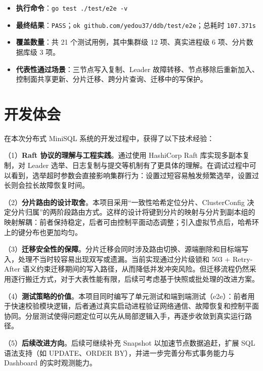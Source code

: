 \documentclass[UTF8,a4paper,12pt]{ctexart}
\begin{document}
\begin{tcolorbox}[
  enhanced,
  colback=GoogleGray,
  colframe=GoogleBlue,
  arc=6pt,
  boxrule=1pt,
  left=1em, right=1em, top=1em, bottom=1em,
  fontupper=\sffamily\small,
  title=\textbf{端到端测试实际运行结果}
]
  \begin{itemize}[leftmargin=2em]
    \item \textbf{执行命令}：\texttt{go test ./test/e2e -v}
    \item \textbf{最终结果}：\texttt{PASS}；\texttt{ok github.com/yedou37/ddb/test/e2e}；总耗时 \texttt{107.371s}
    \item \textbf{覆盖数量}：共 21 个测试用例，其中集群级 12 项、真实进程级 6 项、分片数据库级 3 项。
    \item \textbf{代表性通过场景}：三节点写入复制、Leader 故障转移、节点移除后重新加入、控制面共享更新、分片迁移、跨分片查询、迁移中的写保护。
  \end{itemize}
\end{tcolorbox}

\section{开发体会}
在本次分布式 MiniSQL 系统的开发过程中，获得了以下技术经验：

（1）\textbf{Raft 协议的理解与工程实践}。通过使用 HashiCorp Raft 库实现多副本复制，对 Leader 选举、日志复制与提交等机制有了更具体的理解。在调试过程中可以看到，选举超时参数会直接影响集群行为：设置过短容易触发频繁选举，设置过长则会拉长故障恢复时间。

（2）\textbf{分片路由的设计取舍}。本项目采用“一致性哈希定位分片、ClusterConfig 决定分片归属”的两阶段路由方式。这样的设计将键到分片的映射与分片到副本组的映射解耦：前者保持稳定，后者可由控制平面动态调整；引入虚拟节点后，哈希环上的键分布也更加均匀。

（3）\textbf{迁移安全性的保障}。分片迁移会同时涉及路由切换、源端删除和目标端写入，处理不当时较容易出现双写或遗漏。当前实现通过分片级锁和 503 + Retry-After 语义约束迁移期间的写入路径，从而降低并发冲突风险。但迁移流程仍然采用逐行搬迁方式，对于大表性能有限，后续可考虑基于快照或批处理的改进方案。

（4）\textbf{测试策略的价值}。本项目同时编写了单元测试和端到端测试（e2e）：前者用于快速校验模块逻辑，后者通过真实启动进程验证网络通信、故障恢复和控制平面协同。分层测试使得问题定位可以先从局部逻辑入手，再逐步收敛到真实运行路径。

（5）\textbf{后续改进方向}。后续可继续补充 Snapshot 以加速节点数据追赶，扩展 SQL 语法支持（如 UPDATE、ORDER BY），并进一步完善分布式事务能力与 Dashboard 的实时观测能力。
\end{document}
